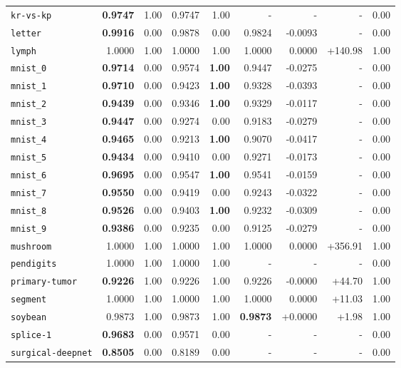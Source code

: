 \begin{tabular}{lrrrrrrrr}
\texttt{kr-vs-kp} & \textbf{0.9747} & 1.00 & 0.9747 & 1.00 & - & - & - & 0.00\\
\texttt{letter} & \textbf{0.9916} & 0.00 & 0.9878 & 0.00 & 0.9824 & -0.0093 & - & 0.00\\
\texttt{lymph} & 1.0000 & 1.00 & 1.0000 & 1.00 & 1.0000 & 0.0000 & +140.98 & 1.00\\
\texttt{mnist\_0} & \textbf{0.9714} & 0.00 & 0.9574 & \textbf{1.00} & 0.9447 & -0.0275 & - & 0.00\\
\texttt{mnist\_1} & \textbf{0.9710} & 0.00 & 0.9423 & \textbf{1.00} & 0.9328 & -0.0393 & - & 0.00\\
\texttt{mnist\_2} & \textbf{0.9439} & 0.00 & 0.9346 & \textbf{1.00} & 0.9329 & -0.0117 & - & 0.00\\
\texttt{mnist\_3} & \textbf{0.9447} & 0.00 & 0.9274 & 0.00 & 0.9183 & -0.0279 & - & 0.00\\
\texttt{mnist\_4} & \textbf{0.9465} & 0.00 & 0.9213 & \textbf{1.00} & 0.9070 & -0.0417 & - & 0.00\\
\texttt{mnist\_5} & \textbf{0.9434} & 0.00 & 0.9410 & 0.00 & 0.9271 & -0.0173 & - & 0.00\\
\texttt{mnist\_6} & \textbf{0.9695} & 0.00 & 0.9547 & \textbf{1.00} & 0.9541 & -0.0159 & - & 0.00\\
\texttt{mnist\_7} & \textbf{0.9550} & 0.00 & 0.9419 & 0.00 & 0.9243 & -0.0322 & - & 0.00\\
\texttt{mnist\_8} & \textbf{0.9526} & 0.00 & 0.9403 & \textbf{1.00} & 0.9232 & -0.0309 & - & 0.00\\
\texttt{mnist\_9} & \textbf{0.9386} & 0.00 & 0.9235 & 0.00 & 0.9125 & -0.0279 & - & 0.00\\
\texttt{mushroom} & 1.0000 & 1.00 & 1.0000 & 1.00 & 1.0000 & 0.0000 & +356.91 & 1.00\\
\texttt{pendigits} & 1.0000 & 1.00 & 1.0000 & 1.00 & - & - & - & 0.00\\
\texttt{primary-tumor} & \textbf{0.9226} & 1.00 & 0.9226 & 1.00 & 0.9226 & -0.0000 & +44.70 & 1.00\\
\texttt{segment} & 1.0000 & 1.00 & 1.0000 & 1.00 & 1.0000 & 0.0000 & +11.03 & 1.00\\
\texttt{soybean} & 0.9873 & 1.00 & 0.9873 & 1.00 & \textbf{0.9873} & +0.0000 & +1.98 & 1.00\\
\texttt{splice-1} & \textbf{0.9683} & 0.00 & 0.9571 & 0.00 & - & - & - & 0.00\\
\texttt{surgical-deepnet} & \textbf{0.8505} & 0.00 & 0.8189 & 0.00 & - & - & - & 0.00\\

\end{tabular}
